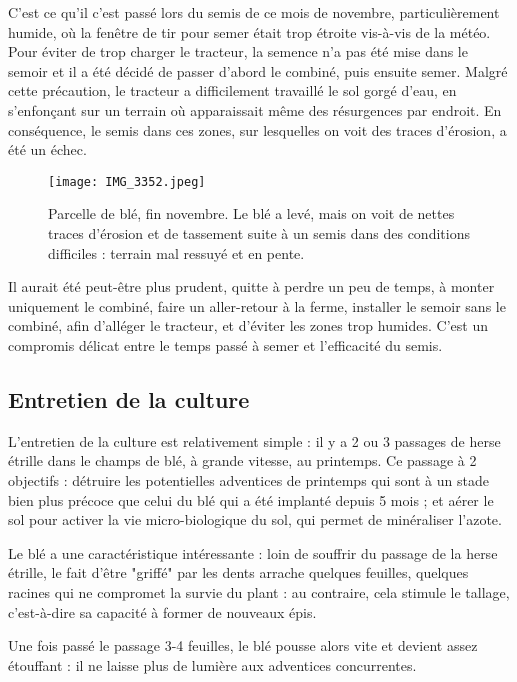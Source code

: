 \documentclass{article}
\begin{document}
C'est ce qu'il c'est passé lors du semis de ce mois de novembre, particulièrement humide, où la fenêtre de tir pour semer était trop étroite vis-à-vis de la météo. Pour éviter de trop charger le tracteur, la semence n'a pas été mise dans le semoir et il a été décidé de passer d'abord le combiné, puis ensuite semer. Malgré cette précaution, le tracteur a difficilement travaillé le sol gorgé d'eau, en s'enfonçant sur un terrain où apparaissait même des résurgences par endroit. En conséquence, le semis dans ces zones, sur lesquelles on voit des traces d'érosion, a été un échec. 

\begin{figure}
\begin{center}
	\texttt{[image: IMG\_3352.jpeg]}
	\caption{Parcelle de blé, fin novembre. Le blé a levé, mais on voit de nettes traces d'érosion et de tassement suite à un semis dans des conditions difficiles : terrain mal ressuyé et en pente.}
\end{center}
\end{figure}

Il aurait été peut-être plus prudent, quitte à perdre un peu de temps, à monter uniquement le combiné, faire un aller-retour à la ferme, installer le semoir sans le combiné, afin d'alléger le tracteur, et d'éviter les zones trop humides. C'est un compromis délicat entre le temps passé à semer et l'efficacité du semis.

\subsection{Entretien de la culture}

L'entretien de la culture est relativement simple : il y a 2 ou 3 passages de herse étrille dans le champs de blé, à grande vitesse, au printemps. Ce passage à 2 objectifs : détruire les potentielles adventices de printemps qui sont à un stade bien plus précoce que celui du blé qui a été implanté depuis 5 mois ; et aérer le sol pour activer la vie micro-biologique du sol, qui permet de minéraliser l'azote. 

Le blé a une caractéristique intéressante : loin de souffrir du passage de la herse étrille, le fait d'être "griffé" par les dents arrache quelques feuilles, quelques racines qui ne compromet la survie du plant : au contraire, cela stimule le tallage, c'est-à-dire sa capacité à former de nouveaux épis.

Une fois passé le passage 3-4 feuilles, le blé pousse alors vite et devient assez étouffant : il ne laisse plus de lumière aux adventices concurrentes.
\end{document}
